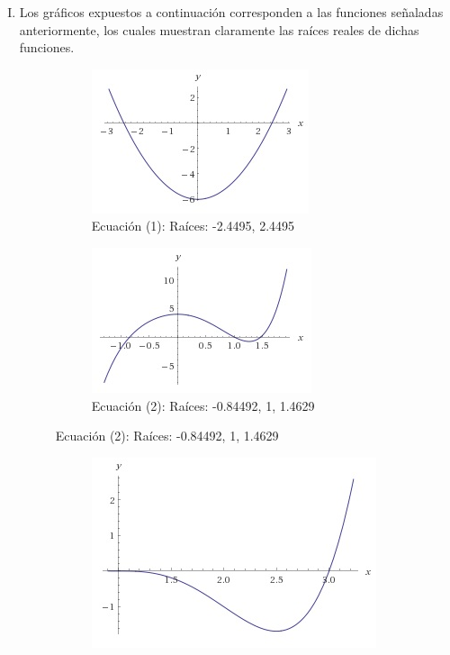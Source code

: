 \documentclass{article}
\begin{document}
\begin{enumerate}[I)]
\newpage

\item Los gráficos expuestos a continuación corresponden a las funciones señaladas anteriormente, los cuales muestran claramente las raíces reales de dichas funciones.
\begin{figure}[h]
\begin{subfigure}{.5\textwidth}
  \centering
  \includegraphics[width=.8\linewidth]{1}
  \caption*{Ecuación (1): Raíces: -2.4495, 2.4495}
\end{subfigure}%
\begin{subfigure}{.5\textwidth}
  \centering
  \includegraphics[width=.8\linewidth]{2}
  \caption*{Ecuación (2): Raíces: -0.84492, 1, 1.4629}
\end{subfigure}
\end{figure}
\begin{figure}[h]
\begin{subfigure}{.5\textwidth}
  \centering
  \includegraphics[width=.8\linewidth]{3}

\end{subfigure}
\end{figure}
\end{enumerate}
\end{document}
